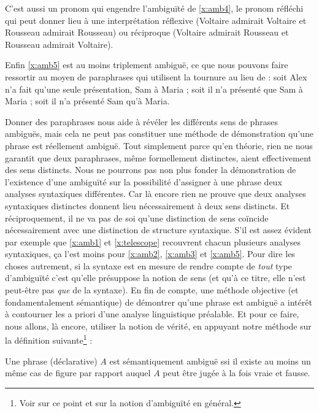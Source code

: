 \begin{refsegment}
C'est aussi un pronom qui engendre l'ambiguïté de \ref{x:amb4}, le pronom réfléchi  qui peut donner lieu à une interprétation réflexive (Voltaire admirait Voltaire et Rousseau admirait Rousseau) ou réciproque (Voltaire admirait Rousseau et Rousseau admirait \mbox{Voltaire}).

Enfin \ref{x:amb5} est au moins triplement ambiguë, ce que nous pouvons faire ressortir au moyen de paraphrases qui utilisent la tournure  au lieu de  : soit Alex n'a fait qu'une seule présentation, Sam à Maria ; soit il n'a présenté que Sam à Maria ; soit il n'a présenté Sam qu'à Maria.


Donner des paraphrases nous aide à révéler les différents sens de phrases ambiguës, mais cela ne peut pas constituer une méthode de démonstration qu'une phrase est réellement ambiguë. Tout simplement parce qu'en théorie, rien ne nous garantit que deux paraphrases, même formellement distinctes, aient effectivement des sens distincts. 
Nous ne pourrons pas non plus fonder la démonstration de l'existence d'une ambiguïté sur la possibilité d'assigner à une phrase deux analyses syntaxiques différentes. 
Car là encore rien ne prouve que deux analyses syntaxiques distinctes donnent lieu nécessairement à deux sens distincts.  Et réciproquement, il ne va pas de soi qu'une distinction de sens coïncide nécessairement avec une distinction de structure syntaxique.  
S'il est assez évident par exemple que  \ref{x:amb1} et \ref{x:telescope} recouvrent chacun plusieurs analyses syntaxiques, ça l'est moins pour \ref{x:amb2}, \ref{x:amb3} et \ref{x:amb5}.  Pour dire les choses autrement, si la syntaxe est en mesure de rendre compte de \emph{tout} type d'ambiguïté c'est qu'elle présuppose la notion de sens (et qu'à ce titre, elle n'est peut-être pas \emph{que} de la syntaxe). 
En fin de compte, une méthode objective (et fondamentalement sémantique) de démontrer qu'une phrase est ambiguë a intérêt à contourner les {a priori} d'une analyse linguistique préalable. 
Et pour ce faire, nous allons, là encore, utiliser la notion de vérité, en  appuyant notre méthode sur la définition suivante\footnote{Voir \citet{Gillon:04x} sur ce point et sur la notion d'ambiguïté en général.} :




\begin{defi} %
\label{d:ambig}
Une phrase (déclarative) $A$ est sémantiquement ambiguë ssi il existe au moins un même cas
de figure par rapport auquel  $A$ peut être jugée à la fois vraie et fausse.
\end{defi}



\end{refsegment}
